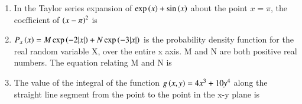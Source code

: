 \documentclass[a4paper, 11pt]{article}
\begin{document}
\begin{enumerate}
    \hfill{}

    \item In the Taylor series expansion of $\exp\left(x\right)+\sin\left(x\right)$ about the point $x=\pi$, the coefficient of $\left(x-\pi\right)^2$ is
    \begin{enumerate}
    \end{enumerate}
    
    \hfill{}

    \item $P_x\left(x\right)=M\exp\left(-2|x|\right)+N\exp\left(-3|x|\right)$ is the probability density function for the real random variable X, over the entire x axis. M and N are both positive real numbers. The equation relating M and N is
    
    \begin{enumerate}
    \end{enumerate}
    
    \hfill{}
    
    \item The value of the integral of the function $g\left(x,y\right)=4x^3+10y^4$ along the straight line segment from the point  to the point  in the x-y plane is
    
    \begin{enumerate}
    \end{enumerate}
    

\end{enumerate}
\end{document}
